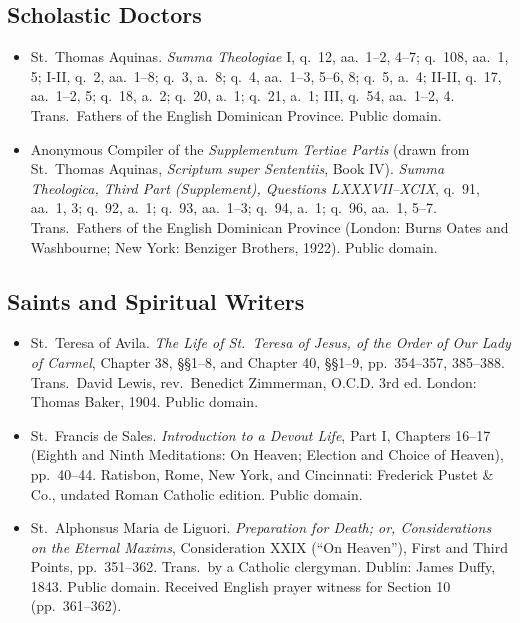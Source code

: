 \subsection*{Scholastic Doctors}

\begin{itemize}
\item St.\ Thomas Aquinas. \textit{Summa Theologiae} I, q.\ 12, aa.\ 1--2, 4--7; q.\ 108, aa.\ 1, 5; I-II, q.\ 2, aa.\ 1--8; q.\ 3, a.\ 8; q.\ 4, aa.\ 1--3, 5--6, 8; q.\ 5, a.\ 4; II-II, q.\ 17, aa.\ 1--2, 5; q.\ 18, a.\ 2; q.\ 20, a.\ 1; q.\ 21, a.\ 1; III, q.\ 54, aa.\ 1--2, 4. Trans.\ Fathers of the English Dominican Province. Public domain.
\item Anonymous Compiler of the \textit{Supplementum Tertiae Partis} (drawn from St.\ Thomas Aquinas, \textit{Scriptum super Sententiis}, Book IV). \textit{Summa Theologica, Third Part (Supplement), Questions LXXXVII--XCIX}, q.\ 91, aa.\ 1, 3; q.\ 92, a.\ 1; q.\ 93, aa.\ 1--3; q.\ 94, a.\ 1; q.\ 96, aa.\ 1, 5--7. Trans.\ Fathers of the English Dominican Province (London: Burns Oates and Washbourne; New York: Benziger Brothers, 1922). Public domain.
\end{itemize}

\subsection*{Saints and Spiritual Writers}

\begin{itemize}
\item St.\ Teresa of Avila. \textit{The Life of St.\ Teresa of Jesus, of the Order of Our Lady of Carmel}, Chapter 38, \S\S 1--8, and Chapter 40, \S\S 1--9, pp.\ 354--357, 385--388. Trans.\ David Lewis, rev.\ Benedict Zimmerman, O.C.D. 3rd ed. London: Thomas Baker, 1904. Public domain.
\item St.\ Francis de Sales. \textit{Introduction to a Devout Life}, Part I, Chapters 16--17 (Eighth and Ninth Meditations: On Heaven; Election and Choice of Heaven), pp.\ 40--44. Ratisbon, Rome, New York, and Cincinnati: Frederick Pustet \& Co., undated Roman Catholic edition. Public domain.
\item St.\ Alphonsus Maria de Liguori. \textit{Preparation for Death; or, Considerations on the Eternal Maxims}, Consideration XXIX (``On Heaven''), First and Third Points, pp.\ 351--362. Trans.\ by a Catholic clergyman. Dublin: James Duffy, 1843. Public domain. Received English prayer witness for Section 10 (pp.\ 361--362).
\end{itemize}
\endgroup
